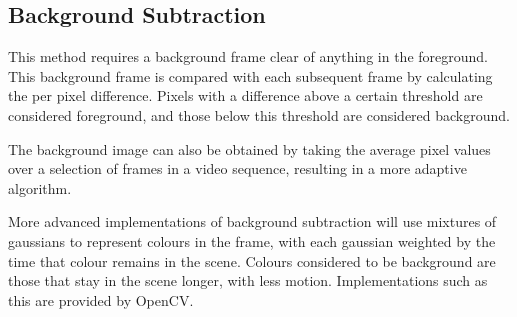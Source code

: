 \subsection{Background Subtraction}

This method requires a background frame clear of anything in the foreground. This background frame is compared with each subsequent frame by calculating the per pixel difference. Pixels with a difference above a certain threshold are considered foreground, and those below this threshold are considered background.

The background image can also be obtained by taking the average pixel values over a selection of frames in a video sequence, resulting in a more adaptive algorithm.

More advanced implementations of background subtraction will use mixtures of gaussians to represent colours in the frame, with each gaussian weighted by the time that colour remains in the scene\cite{backgroundsubmog}. Colours considered to be background are those that stay in the scene longer, with less motion. Implementations such as this are provided by OpenCV\cite{opencv}.